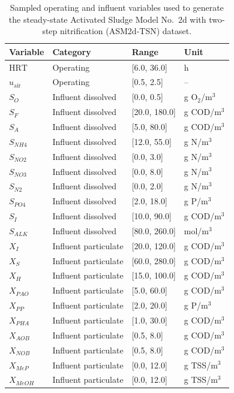 \documentclass[a4paper,fleqn]{cas-sc}
\newcommand{\csvcomma}{,}
\begin{document}
\begin{table}[htbp]
\centering
\caption{Sampled operating and influent variables used to generate the steady-state Activated Sludge Model No.\ 2d with two-step nitrification (ASM2d-TSN) dataset.}
\label{tab:simulation_domain}
\scriptsize
\setlength{\tabcolsep}{3pt}
\begin{tabular}{p{2.1cm}p{2.7cm}p{2.8cm}p{3.0cm}}
\hline
Variable & Category & Range & Unit \\
\hline
$\mathrm{HRT}$ & Operating & [6.0\csvcomma{} 36.0] & h \\
$u_{\mathrm{air}}$ & Operating & [0.5\csvcomma{} 2.5] & -- \\
$S_O$ & Influent dissolved & [0.0\csvcomma{} 0.5] & g O$_2$/m$^3$ \\
$S_F$ & Influent dissolved & [20.0\csvcomma{} 180.0] & g COD/m$^3$ \\
$S_A$ & Influent dissolved & [5.0\csvcomma{} 80.0] & g COD/m$^3$ \\
$S_{NH4}$ & Influent dissolved & [12.0\csvcomma{} 55.0] & g N/m$^3$ \\
$S_{NO2}$ & Influent dissolved & [0.0\csvcomma{} 3.0] & g N/m$^3$ \\
$S_{NO3}$ & Influent dissolved & [0.0\csvcomma{} 8.0] & g N/m$^3$ \\
$S_{N2}$ & Influent dissolved & [0.0\csvcomma{} 2.0] & g N/m$^3$ \\
$S_{PO4}$ & Influent dissolved & [2.0\csvcomma{} 18.0] & g P/m$^3$ \\
$S_I$ & Influent dissolved & [10.0\csvcomma{} 90.0] & g COD/m$^3$ \\
$S_{ALK}$ & Influent dissolved & [80.0\csvcomma{} 260.0] & mol/m$^3$ \\
$X_I$ & Influent particulate & [20.0\csvcomma{} 120.0] & g COD/m$^3$ \\
$X_S$ & Influent particulate & [60.0\csvcomma{} 280.0] & g COD/m$^3$ \\
$X_H$ & Influent particulate & [15.0\csvcomma{} 100.0] & g COD/m$^3$ \\
$X_{PAO}$ & Influent particulate & [5.0\csvcomma{} 60.0] & g COD/m$^3$ \\
$X_{PP}$ & Influent particulate & [2.0\csvcomma{} 20.0] & g P/m$^3$ \\
$X_{PHA}$ & Influent particulate & [1.0\csvcomma{} 30.0] & g COD/m$^3$ \\
$X_{AOB}$ & Influent particulate & [0.5\csvcomma{} 8.0] & g COD/m$^3$ \\
$X_{NOB}$ & Influent particulate & [0.5\csvcomma{} 8.0] & g COD/m$^3$ \\
$X_{MeP}$ & Influent particulate & [0.0\csvcomma{} 12.0] & g TSS/m$^3$ \\
$X_{MeOH}$ & Influent particulate & [0.0\csvcomma{} 12.0] & g TSS/m$^3$ \\
\hline
\end{tabular}
\end{table}
\end{document}
